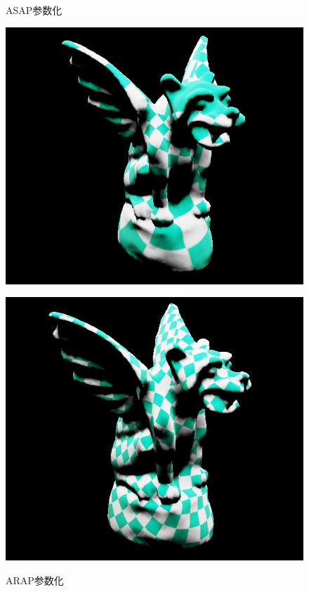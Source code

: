 \documentclass{article}
\begin{document}
\begin{figure}[htbp]
\begin{minipage}{0.24\linewidth}
			\label{chutian2}%
		\end{minipage}
		\begin{minipage}{0.24\linewidth}
			\centering
			\caption{ASAP参数化}
			\includegraphics[width=1\linewidth]{gargoyle_asap_tex.JPG}
			\label{chutian2}%
		\end{minipage}
		\begin{minipage}{0.24\linewidth}
			\centering
			\caption{ARAP参数化}
			\includegraphics[width=1\linewidth]{gargoyle_arap_tex.JPG}
			\label{chutian2}%
		\end{minipage}
	\end{figure}
	\clearpage
	
\end{document}
